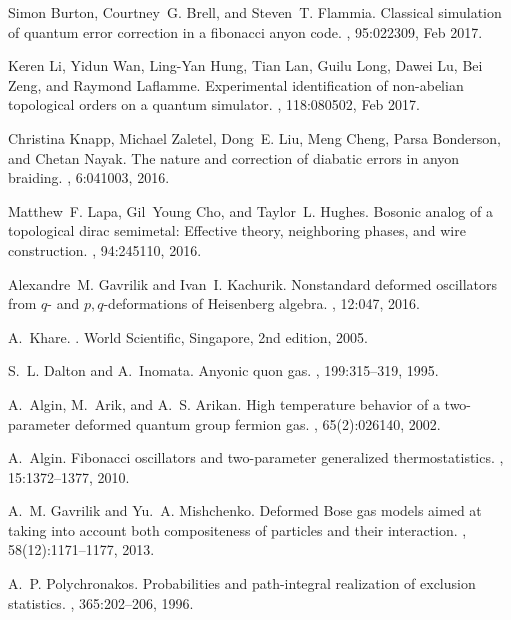 \documentclass[12pt,a4paper]{article}
\begin{document}
{\begin{thebibliography}{10}
Simon Burton, Courtney~G. Brell, and Steven~T. Flammia.
\newblock Classical simulation of quantum error correction in a fibonacci anyon
  code.
, 95:022309, Feb 2017.

Keren Li, Yidun Wan, Ling-Yan Hung, Tian Lan, Guilu Long, Dawei Lu, Bei Zeng,
  and Raymond Laflamme.
\newblock Experimental identification of non-abelian topological orders on a
  quantum simulator.
, 118:080502, Feb 2017.

Christina Knapp, Michael Zaletel, Dong~E. Liu, Meng Cheng, Parsa Bonderson, and
  Chetan Nayak.
\newblock The nature and correction of diabatic errors in anyon braiding.
, 6:041003, 2016.

Matthew~F. Lapa, Gil~Young Cho, and Taylor~L. Hughes.
\newblock Bosonic analog of a topological dirac semimetal: Effective theory,
  neighboring phases, and wire construction.
, 94:245110, 2016.

Alexandre~M. Gavrilik and Ivan~I. Kachurik.
\newblock Nonstandard deformed oscillators from $q$- and $p,q$-deformations of
  {H}eisenberg algebra.
, 12:047, 2016.

A.~Khare.
.
\newblock World Scientific, Singapore, 2nd edition, 2005.

S.~L. Dalton and A.~Inomata.
\newblock Anyonic quon gas.
, 199:315--319, 1995.

A.~Algin, M.~Arik, and A.~S. Arikan.
\newblock High temperature behavior of a two-parameter deformed quantum group
  fermion gas.
, 65(2):026140, 2002.

A.~Algin.
\newblock Fibonacci oscillators and two-parameter generalized thermostatistics.
, 15:1372--1377, 2010.

A.~M. Gavrilik and Yu.~A. Mishchenko.
\newblock Deformed {B}ose gas models aimed at taking into account both
  compositeness of particles and their interaction.
, 58(12):1171--1177, 2013.

A.~P. Polychronakos.
\newblock Probabilities and path-integral realization of exclusion statistics.
, 365:202--206, 1996.


\end{thebibliography}}
\end{document}
